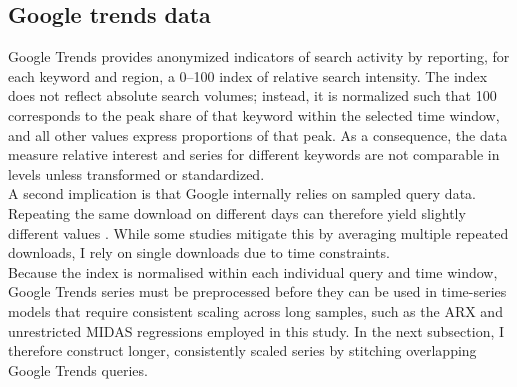 \documentclass[12pt,a4paper]{article}
\begin{document}
\subsection{Google trends data}
Google Trends provides anonymized indicators of search activity by reporting, for each keyword and region, a 0–100 index of relative search intensity. The index does not reflect absolute search volumes; instead, it is normalized such that 100 corresponds to the peak share of that keyword within the selected time window, and all other values express proportions of that peak. As a consequence, the data measure relative interest and series for different keywords are not comparable in levels unless transformed or standardized.\\
A second implication is that Google internally relies on sampled query data. Repeating the same download on different days can therefore yield slightly different values \citep{carrier}.
While some studies mitigate this by averaging multiple repeated downloads, I rely on single downloads due to time constraints.\\
Because the index is normalised within each individual query and time window, Google Trends series must be preprocessed before they can be used in time-series models that require consistent scaling across long samples, such as the ARX and unrestricted MIDAS regressions employed in this study. In the next subsection, I therefore construct longer, consistently scaled series by stitching overlapping Google Trends queries.
\end{document}
